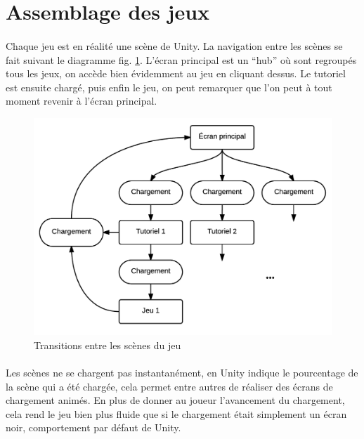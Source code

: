 \section{Assemblage des jeux}
\paragraph{}
Chaque jeu est en réalité une scène de Unity. La navigation entre les scènes se fait suivant le diagramme fig. \ref{transitions_scenes}. L'écran principal est un ``hub'' où sont regroupés tous les jeux, on accède bien évidemment au jeu en cliquant dessus. Le tutoriel est ensuite chargé, puis enfin le jeu, on peut remarquer que l'on peut à tout moment revenir à l'écran principal.

\begin{figure}[H]\centering
  \includegraphics[scale=0.7]{./img/scenes-transitions.png}
  \caption{Transitions entre les scènes du jeu}
  \label{transitions_scenes}
\end{figure}

\paragraph{}
Les scènes ne se chargent pas instantanément, en Unity indique le pourcentage de la scène qui a été chargée, cela permet entre autres de réaliser des écrans de chargement animés. En plus de donner au joueur l'avancement du chargement, cela rend le jeu bien plus fluide que si le chargement était simplement un écran noir, comportement par défaut de Unity.

